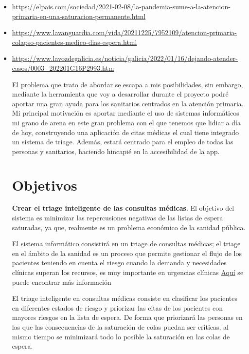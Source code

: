 \begin{itemize}
    \item \url{https://elpais.com/sociedad/2021-02-08/la-pandemia-sume-a-la-atencion-primaria-en-una-saturacion-permanente.html} 
    \item \url{https://www.lavanguardia.com/vida/20211225/7952109/atencion-primaria-colapso-pacientes-medico-dias-espera.html}
    \item \url{https://www.lavozdegalicia.es/noticia/galicia/2022/01/16/dejando-atender-casos/0003_202201G16P2993.htm}

El problema que trato de abordar se escapa a mis posibilidades, sin embargo, mediante la herramienta que voy a desarrollar 
durante el proyecto podré aportar una gran ayuda para los sanitarios centrados en la atención primaria.
Mi principal motivación es aportar mediante el uso de sistemas informáticos mi grano de arena en este gran problema con el que 
tenemos que lidiar a día de hoy, construyendo una aplicación de citas médicas el cual tiene integrado un sistema de triage. 
Además, estará centrado para el empleo de todas las personas y sanitarios, haciendo hincapié en la accesibilidad de la app.

\section{Objetivos}

\textbf{Crear el triage inteligente de las consultas médicas}. El objetivo del sistema es minimizar las repercusiones negativas 
de las listas de espera saturadas, ya que, realmente es un problema económico de la sanidad pública.

El sistema informático consistirá en un triage de consultas médicas; el triage en el ámbito de la sanidad es un proceso que permite gestionar
el flujo de los pacientes teniendo en cuenta el riesgo cuando la demanda y necesidades clínicas superan los recursos, es muy importante en urgencias clínicas
\href{https://scielo.isciii.es/scielo.php?script=sci_arttext&pid=S1137-66272010000200008}{Aquí} se puede encontrar más información

El triage inteligente en consultas médicas consiste en clasificar los pacientes en diferentes estados de riesgo y priorizar las citas 
de los pacientes con mayores riesgos en la lista de espera. De forma que priorizará las personas en las que las consecuencias de la 
saturación de colas puedan ser críticas, al mismo tiempo se minimizará todo lo posible la saturación en las colas de espera.


\end{itemize}
